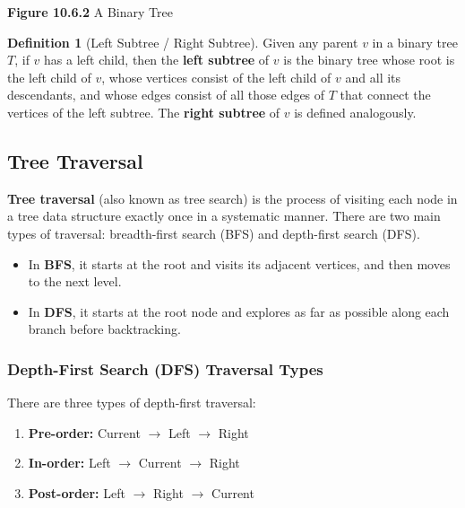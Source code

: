 \documentclass{article}
\theoremstyle{plain}
\theoremstyle{definition}
\newtheorem*{definition}{Definition}
\theoremstyle{remark}
\begin{document}
\begin{center}
\vspace{0.5em}

\textbf{Figure 10.6.2} A Binary Tree
\end{center}
\vspace{1em}

\begin{definition}[Left Subtree / Right Subtree]
    Given any parent $v$ in a binary tree $T$, if $v$ has a left child, then the \textbf{left subtree} of $v$ is the binary tree whose root is the left child of $v$, whose vertices consist of the left child of $v$ and all its descendants, and whose edges consist of all those edges of $T$ that connect the vertices of the left subtree. The \textbf{right subtree} of $v$ is defined analogously.
\end{definition}

\subsection{Tree Traversal}

\textbf{Tree traversal} (also known as tree search) is the process of visiting each node in a tree data structure exactly once in a systematic manner. There are two main types of traversal: breadth-first search (BFS) and depth-first search (DFS).
\begin{itemize}
    \item In \textbf{BFS}, it starts at the root and visits its adjacent vertices, and then moves to the next level.
    \item In \textbf{DFS}, it starts at the root node and explores as far as possible along each branch before backtracking.
\end{itemize}

\subsubsection*{Depth-First Search (DFS) Traversal Types}
There are three types of depth-first traversal:
\begin{enumerate}
    \item \textbf{Pre-order:} Current $\rightarrow$ Left $\rightarrow$ Right
    \item \textbf{In-order:} Left $\rightarrow$ Current $\rightarrow$ Right
    \item \textbf{Post-order:} Left $\rightarrow$ Right $\rightarrow$ Current
\end{enumerate}
\end{document}
